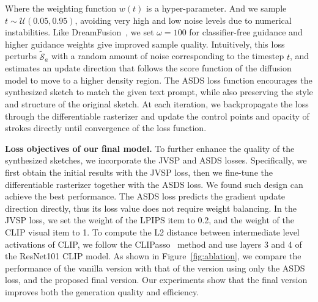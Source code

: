 \documentclass{article}
\begin{document}
Where the weighting function $w(t)$ is a hyper-parameter. And we sample $t \sim \mathcal{U}(0.05, 0.95)$, avoiding very high and low noise levels due to numerical instabilities. Like DreamFusion~\cite{poole_2023_dreamfusion}, we set $\omega = 100$ for classifier-free guidance and higher guidance weights give improved sample quality.
Intuitively, this loss perturbs $\tilde{\mathcal{S}}_a$ with a random amount of noise corresponding to the timestep $t$, and estimates an update direction that follows the score function of the diffusion model to move to a higher density region.
The ASDS loss function encourages the synthesized sketch to match the given text prompt, while also preserving the style and structure of the original sketch.
At each iteration, we backpropagate the loss through the differentiable rasterizer and update the control points and opacity of strokes directly until convergence of the loss function.

\noindent\textbf{Loss objectives of our final model.} To further enhance the quality of the synthesized sketches, we incorporate the JVSP and ASDS losses. Specifically, we first obtain the initial results with the JVSP loss, then we fine-tune the differentiable rasterizer together with the ASDS loss. We found such design can achieve the best performance. The ASDS loss predicts the gradient update direction directly, thus its loss value does not require weight balancing. In the JVSP loss, we set the weight of the LPIPS item to 0.2, and the weight of the CLIP visual item to 1. To compute the L2 distance between intermediate level activations of CLIP, we follow the CLIPasso~\cite{clipascene_vinker_2022} method and use layers 3 and 4 of the ResNet101 CLIP model.
As shown in Figure~\ref{fig:ablation}, we compare the performance of the vanilla version with that of the version using only the ASDS loss, and the proposed final version. Our experiments show that the final version improves both the generation quality and efficiency.
\end{document}
